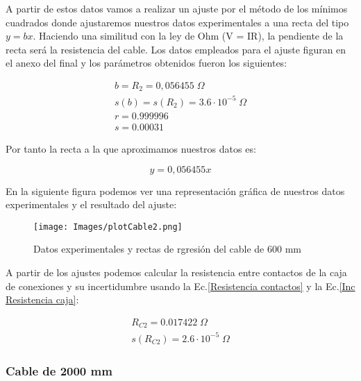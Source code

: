 \documentclass[a4paper,12pt,titlepage]{article}
\begin{document}
A partir de estos datos vamos a realizar un ajuste por el método de los mínimos cuadrados donde ajustaremos nuestros datos experimentales a una recta del tipo $y = bx$. Haciendo una similitud con la ley de Ohm (V = IR), la pendiente de la recta será la resistencia del cable. Los datos empleados para el ajuste figuran en el anexo del final y los parámetros obtenidos fueron los siguientes:

\begin{equation}
    \begin{gathered}
        b = R_{2} = 0,056455 \; \Omega \\
        s(b) = s(R_{2}) = 3.6 \cdot 10^{-5} \; \Omega \\
        r =  0.999996 \\
        s =  0.00031
    \end{gathered}
\end{equation}

Por tanto la recta a la que aproximamos nuestros datos es:

\begin{equation}
    y = 0,056455x
\end{equation}

En la siguiente figura podemos ver una representación gráfica de nuestros datos experimentales y el resultado del ajuste:

\begin{figure}[h!]
    \centering
    \texttt{[image: Images/plotCable2.png]}
    \caption{Datos experimentales y rectas de rgresión del cable de 600 mm}
\end{figure}

A partir de los ajustes podemos calcular la resistencia entre contactos de la caja de conexiones y su incertidumbre usando la Ec.\ref{Resistencia contactos} y la Ec.\ref{Inc Resistencia caja}:

\begin{equation}
    \begin{gathered}
        R_{C2} = 0.017422 \; \Omega\\
        s(R_{C2}) = 2.6 \cdot 10^{-5}\; \Omega
    \end{gathered}
\end{equation}

\newpage

\subsubsection{Cable de 2000 mm}
\end{document}
